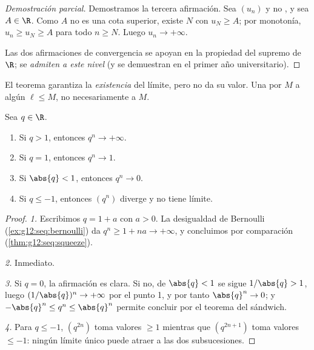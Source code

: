 \begin{proof}[Demostración parcial]
Demostramos la tercera afirmación. Sea $(u_n)$  y no , y sea $A \in \R$. Como $A$ no es una cota superior, existe
$N$ con $u_N \geq A$; por monotonía, $u_n \geq u_N \geq A$ para todo
$n \geq N$. Luego $u_n \to +\infty$.

Las dos afirmaciones de convergencia se apoyan en la propiedad del
supremo de $\R$; se \emph{admiten a este nivel} (y se demuestran en el
primer año universitario).
\end{proof}

\begin{remark}
El teorema garantiza la \emph{existencia} del límite, pero no da su valor.
Una    por $M$  a algún
$\ell \leq M$, no necesariamente a $M$.
\end{remark}

\begin{theorem}\label{thm:g12:seq:geometric}
Sea $q \in \R$.
\begin{enumerate}
  \item Si $q > 1$, entonces $q^n \to +\infty$.
  \item Si $q = 1$, entonces $q^n \to 1$.
  \item Si $\abs{q} < 1$, entonces $q^n \to 0$.
  \item Si $q \leq -1$, entonces $(q^n)$ diverge y no tiene límite.
\end{enumerate}
\end{theorem}

\begin{proof}
\emph{1.} Escribimos $q = 1 + a$ con $a > 0$. La desigualdad de Bernoulli
(\cref{ex:g12:seq:bernoulli}) da $q^n \geq 1 + na \to +\infty$, y
concluimos por comparación (\cref{thm:g12:seq:squeeze}).

\emph{2.} Inmediato.

\emph{3.} Si $q = 0$, la afirmación es clara. Si no, de $\abs{q} < 1$ se
sigue $1/\abs{q} > 1$, luego $(1/\abs{q})^n \to +\infty$ por el punto 1, y
por tanto $\abs{q}^n \to 0$; y $-\abs{q}^n \leq q^n \leq \abs{q}^n$ permite
concluir por el teorema del sándwich.

\emph{4.} Para $q \leq -1$, $(q^{2n})$ toma valores $\geq 1$ mientras que
$(q^{2n+1})$ toma valores $\leq -1$: ningún límite único puede atraer a
las dos subsucesiones.
\end{proof}

